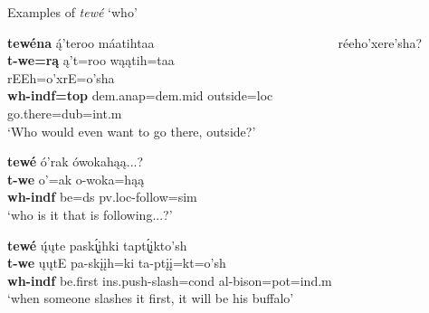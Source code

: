 \begin{exe}

\item\label{ExamplesOfTewe} Examples of \textit{tewé} `who'

    \begin{xlist}
    
    \item\label{ExamplesOfTewe1} \glll \textbf{tewéna} ą́'teroo máatihtaa ~ ~ ~ ~ ~ ~ ~ ~ ~ ~ ~ ~ ~ ~ ~ ~ ~ réeho'xere'sha?\\
    \textbf{t-we=rą} ą't=roo wąątih=taa ~ ~ ~ ~ ~ ~ ~ ~ ~ ~ ~ ~ ~ ~ ~ ~ ~ rEEh=o'xrE=o'sha\\
    \textbf{wh-indf=top} dem.anap=dem.mid \textnormal{outside}=loc ~ ~ ~ ~ ~ ~ ~ ~ ~ ~ ~ ~ ~ ~ ~ ~ ~ \textnormal{go.there}=dub=int.m\\
    \glt `Who would even want to go there, outside?' \citep[108]{hollow1973b}
    
    \item\label{ExamplesOfTewe2} \glll \textbf{tewé} ó'rak ówokahąą...?\\
    \textbf{t-we} o'=ak o-woka=hąą\\
    \textbf{wh-indf} \textnormal{be}=ds pv.loc-\textnormal{follow}=sim\\
    \glt `who is  it that is following...?' \citep[66]{hollow1973a}
    
    \item\label{ExamplesOfTewe3} \glll \textbf{tewé} ų́ųte pask\'{ı̨}įhki   tapt\'{ı̨}įkto'sh\\
    \textbf{t-we} ųųtE pa-skįįh=ki ta-ptįį=kt=o'sh\\
    \textbf{wh-indf} \textnormal{be.first} ins.push-\textnormal{slash}=cond al-\textnormal{bison}=pot=ind.m\\
    \glt `when someone slashes it first, it will be his buffalo' \citep[6]{hollow1973b}
    
    \end{xlist}

\end{exe}

